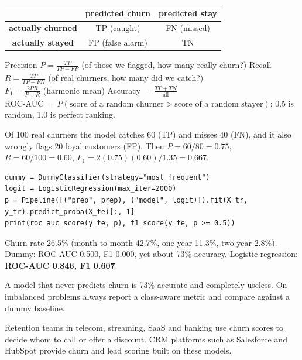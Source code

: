 \documentclass[11pt,a4paper]{article}
\begin{document}
\begin{center}
\renewcommand{\arraystretch}{1.4}
\begin{tabular}{c|c|c}
 & \textbf{predicted churn} & \textbf{predicted stay}\\\hline
\textbf{actually churned} & TP (caught) & FN (missed)\\\hline
\textbf{actually stayed} & FP (false alarm) & TN\\
\end{tabular}
\end{center}
\begin{bmath}[Metrics]
Precision $P=\frac{TP}{TP+FP}$ (of those we flagged, how many really churn?) \qquad Recall $R=\frac{TP}{TP+FN}$ (of real churners, how many did we catch?)\\[3pt]
$F_1=\frac{2PR}{P+R}$ (harmonic mean) \qquad Accuracy $=\frac{TP+TN}{\text{all}}$\\[3pt]
ROC-AUC $=P(\text{score of a random churner}>\text{score of a random stayer})$; 0.5 is random, 1.0 is perfect ranking.
\end{bmath}
\begin{bex}
Of 100 real churners the model catches 60 (TP) and misses 40 (FN), and it also wrongly flags 20 loyal customers (FP). Then $P=60/80=0.75$, $R=60/100=0.60$, $F_1=2(0.75)(0.60)/1.35=0.667$.
\end{bex}
\begin{bcode}
\begin{lstlisting}
dummy = DummyClassifier(strategy="most_frequent")
logit = LogisticRegression(max_iter=2000)
p = Pipeline([("prep", prep), ("model", logit)]).fit(X_tr, y_tr).predict_proba(X_te)[:, 1]
print(roc_auc_score(y_te, p), f1_score(y_te, p >= 0.5))
\end{lstlisting}
\end{bcode}
\begin{bres}
Churn rate 26.5\% (month-to-month 42.7\%, one-year 11.3\%, two-year 2.8\%). Dummy: ROC-AUC 0.500, F1 0.000, yet about 73\% accuracy. Logistic regression: \textbf{ROC-AUC 0.846, F1 0.607}.
\end{bres}
\begin{bwarn}
A model that never predicts churn is 73\% accurate and completely useless. On imbalanced problems always report a class-aware metric and compare against a dummy baseline.
\end{bwarn}
\begin{bapp}
Retention teams in telecom, streaming, SaaS and banking use churn scores to decide whom to call or offer a discount. CRM platforms such as Salesforce and HubSpot provide churn and lead scoring built on these models.
\end{bapp}
\end{document}

